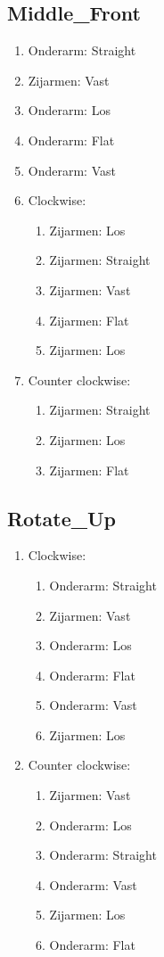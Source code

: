 \subsection{Middle\_Front}

\begin{enumerate}
	\item Onderarm: Straight
	\item Zijarmen: Vast
	\item Onderarm: Los
	\item Onderarm: Flat
	\item Onderarm: Vast
	\item Clockwise:
	\begin{enumerate}
		\item Zijarmen: Los
		\item Zijarmen: Straight
		\item Zijarmen: Vast
		\item Zijarmen: Flat
		\item Zijarmen: Los
	\end{enumerate}
	\item Counter clockwise:
	\begin{enumerate}
		\item Zijarmen: Straight
		\item Zijarmen: Los
		\item Zijarmen: Flat
	\end{enumerate}
\end{enumerate}
\newpage

\subsection{Rotate\_Up}

\begin{enumerate}
	\item Clockwise:
	\begin{enumerate}
		\item Onderarm: Straight
		\item Zijarmen: Vast
		\item Onderarm: Los
		\item Onderarm: Flat
		\item Onderarm: Vast
		\item Zijarmen: Los
	\end{enumerate}
	\item Counter clockwise:
	\begin{enumerate}
		\item Zijarmen: Vast
		\item Onderarm: Los
		\item Onderarm: Straight
		\item Onderarm: Vast
		\item Zijarmen: Los
		\item Onderarm: Flat
	\end{enumerate}
\end{enumerate}
\newpage


